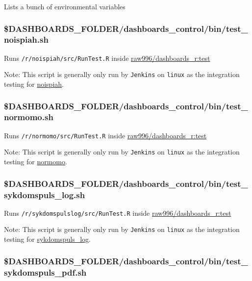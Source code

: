 \documentclass[12pt,]{article}
\begin{document}
Lists a bunch of environmental variables

\hypertarget{test_noispiah}{\subsubsection{\$DASHBOARDS\_FOLDER/dashboards\_control/bin/test\_noispiah.sh}\label{test_noispiah}}

Runs \texttt{/r/noispiah/src/RunTest.R} inside
\href{https://github.com/raubreywhite/dashboards_control/blob/master/infrastructure/dashboards_r/Dockerfile}{raw996/dashboards\_r:test}

Note: This script is generally only run by \texttt{Jenkins} on
\texttt{linux} as the integration testing for
\href{https://folkehelseinstituttet.github.io/dashboards_noispiah/}{noispiah}.

\subsubsection{\$DASHBOARDS\_FOLDER/dashboards\_control/bin/test\_normomo.sh}\label{dashboards_folderdashboards_controlbintest_normomo.sh}

Runs \texttt{/r/normomo/src/RunTest.R} inside
\href{https://github.com/raubreywhite/dashboards_control/blob/master/infrastructure/dashboards_r/Dockerfile}{raw996/dashboards\_r:test}

Note: This script is generally only run by \texttt{Jenkins} on
\texttt{linux} as the integration testing for
\href{https://folkehelseinstituttet.github.io/dashboards_normomo/}{normomo}.

\subsubsection{\$DASHBOARDS\_FOLDER/dashboards\_control/bin/test\_sykdomspuls\_log.sh}\label{dashboards_folderdashboards_controlbintest_sykdomspuls_log.sh}

Runs \texttt{/r/sykdomspulslog/src/RunTest.R} inside
\href{https://github.com/raubreywhite/dashboards_control/blob/master/infrastructure/dashboards_r/Dockerfile}{raw996/dashboards\_r:test}

Note: This script is generally only run by \texttt{Jenkins} on
\texttt{linux} as the integration testing for
\href{https://folkehelseinstituttet.github.io/dashboards_sykdomspuls_log/}{sykdomspuls\_log}.

\subsubsection{\$DASHBOARDS\_FOLDER/dashboards\_control/bin/test\_sykdomspuls\_pdf.sh}\label{dashboards_folderdashboards_controlbintest_sykdomspuls_pdf.sh}
\end{document}
